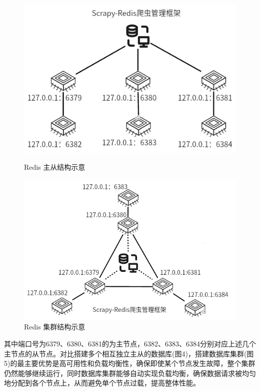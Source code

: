 \documentclass[12pt,hyperref,a4paper,UTF8]{ctexart}
\begin{document}
\begin{figure}[H]  
    \centering  
    \begin{minipage}{0.48\textwidth}  
        \centering  
        \includegraphics[width=\textwidth]{figures/redis-cluster.png}  
        \caption{Redis 主从结构示意}  
    \end{minipage}  
    \hfill %
    \begin{minipage}{0.48\textwidth}  
        \centering  
        \includegraphics[width=\textwidth]{figures/redis-cluster2.png}  
        \caption{Redis 集群结构示意}  
    \end{minipage}  
\end{figure} 

其中端口号为6379、6380、6381的为主节点，6382、6383、6384分别对应上述几个主节点的从节点。对比搭建多个相互独立主从的数据库(图4)，搭建数据库集群(图5)的最主要优势是高可用性和负载均衡性，确保即使某个节点发生故障，整个集群仍然能够继续运行，同时数据库集群能够自动实现负载均衡，确保数据请求被均匀地分配到各个节点上，从而避免单个节点过载，提高整体性能。
\end{document}
